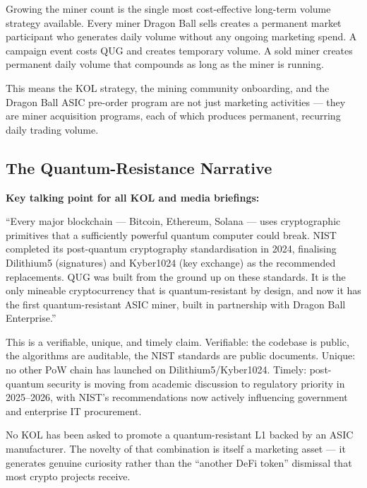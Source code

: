 \documentclass[11pt,a4paper]{article}
\begin{document}
Growing the miner count is the single most cost-effective long-term volume strategy available. Every miner Dragon Ball sells creates a permanent market participant who generates daily volume without any ongoing marketing spend. A campaign event costs QUG and creates temporary volume. A sold miner creates permanent daily volume that compounds as long as the miner is running.

This means the KOL strategy, the mining community onboarding, and the Dragon Ball ASIC pre-order program are not just marketing activities — they are miner acquisition programs, each of which produces permanent, recurring daily trading volume.

\subsection{The Quantum-Resistance Narrative}

\begin{tcolorbox}[graybox]
\textbf{Key talking point for all KOL and media briefings:}

\medskip
``Every major blockchain — Bitcoin, Ethereum, Solana — uses cryptographic primitives that a sufficiently powerful quantum computer could break. NIST completed its post-quantum cryptography standardisation in 2024, finalising Dilithium5 (signatures) and Kyber1024 (key exchange) as the recommended replacements. QUG was built from the ground up on these standards. It is the only mineable cryptocurrency that is quantum-resistant by design, and now it has the first quantum-resistant ASIC miner, built in partnership with Dragon Ball Enterprise.''

\medskip
This is a verifiable, unique, and timely claim. Verifiable: the codebase is public, the algorithms are auditable, the NIST standards are public documents. Unique: no other PoW chain has launched on Dilithium5/Kyber1024. Timely: post-quantum security is moving from academic discussion to regulatory priority in 2025--2026, with NIST's recommendations now actively influencing government and enterprise IT procurement.

\medskip
No KOL has been asked to promote a quantum-resistant L1 backed by an ASIC manufacturer. The novelty of that combination is itself a marketing asset — it generates genuine curiosity rather than the ``another DeFi token'' dismissal that most crypto projects receive.
\end{tcolorbox}

\end{document}
